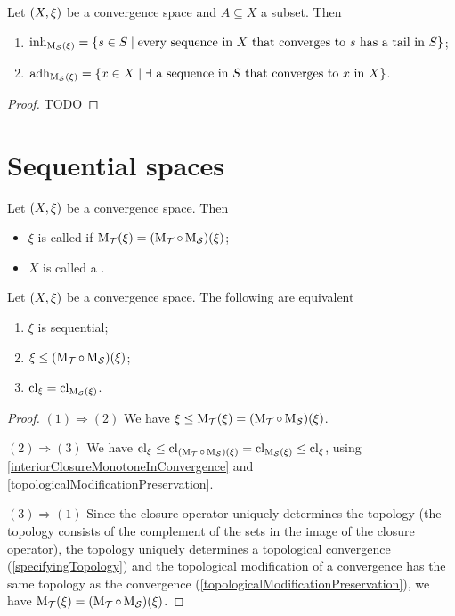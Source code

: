 \begin{proposition}
Let $\left( X,\xi \right)$ be a convergence space and $A\subseteq X$ a subset. Then
\begin{enumerate}
\item $\inh_{\seqMod(\xi)} = \setbuilder{s\in S}{\text{every sequence in $X$ that converges to $s$ has a tail in $S$}}$;
\item $\adh_{\seqMod(\xi)} = \setbuilder{x\in X}{\text{$\exists$ a sequence in $S$ that converges to $x$ in $X$}}$.
\end{enumerate}
\end{proposition}
\begin{proof}
TODO
\end{proof}

\section{Sequential spaces}
\begin{definition}
Let $\left( X,\xi \right)$ be a convergence space. Then
\begin{itemize}
\item $\xi$ is called  if $\operatorname{M_\mathcal{T}}(\xi) = (\operatorname{M_\mathcal{T}}\circ \operatorname{M_\mathcal{S}})(\xi)$;
\item $X$ is called a .
\end{itemize} 
\end{definition}

\begin{lemma} \label{sequentialLemma}
Let $\left( X,\xi \right)$ be a convergence space. The following are equivalent
\begin{enumerate}
\item $\xi$ is sequential;
\item $\xi \leq (\operatorname{M_\mathcal{T}}\circ \operatorname{M_\mathcal{S}})(\xi)$;
\item $\operatorname{cl}_\xi = \operatorname{cl}_{\operatorname{M_\mathcal{S}}(\xi)}$.
\end{enumerate}
\end{lemma}
\begin{proof}
$(1) \Rightarrow (2)$ We have $\xi \leq \operatorname{M_\mathcal{T}}(\xi) = (\operatorname{M_\mathcal{T}}\circ \operatorname{M_\mathcal{S}})(\xi)$.

$(2) \Rightarrow (3)$  We have $\operatorname{cl}_\xi \leq \operatorname{cl}_{(\operatorname{M_\mathcal{T}}\circ \operatorname{M_\mathcal{S}})(\xi)} = \operatorname{cl}_{\operatorname{M_\mathcal{S}}(\xi)} \leq \operatorname{cl}_\xi$, using \ref{interiorClosureMonotoneInConvergence} and \ref{topologicalModificationPreservation}.

$(3) \Rightarrow (1)$ Since the closure operator uniquely determines the topology (the topology consists of the complement of the sets in the image of the closure operator), the topology uniquely determines a topological convergence (\ref{specifyingTopology}) and the topological modification of a convergence has the same topology as the convergence (\ref{topologicalModificationPreservation}), we have $\operatorname{M_\mathcal{T}}(\xi) = (\operatorname{M_\mathcal{T}}\circ \operatorname{M_\mathcal{S}})(\xi)$.
\end{proof}

